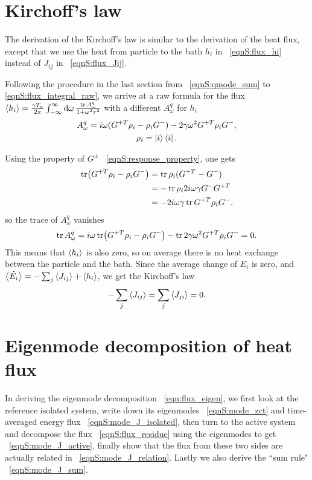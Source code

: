 \documentclass[
 amsmath,amssymb,
 aps,
 pre,
 longbibliography,
 10pt, onecolumn,
 notitlepage
]{revtex4-1}
\begin{document}
\section{Kirchoff's law}
The derivation of the Kirchoff's law is similar to the derivation of the heat flux, except that we use the heat from particle to the bath $h_i$ in \eqnname~\eqref{eqnS:flux_hi} instead of $J_{ij}$ in \eqnname~\eqref{eqnS:flux_Jij}.

Following the procedure in the last section from \eqnname~\eqref{eqnS:qmode_sum} to \eqref{eqnS:flux_integral_raw}, we arrive at a raw formula for the flux $\expval{h_i} = \frac{\gamma T_a}{2\pi} \int_{-\infty}^{\infty} \dd{\omega} \frac{\tr A_\omega^q}{1+\omega^2\tau^2}$ with a different $A_\omega^q$ for $h_i$
\begin{gather}
A_\omega^q = i\omega (G^{+T} \rho_i - \rho_iG^-) - 2\gamma\omega^2 G^{+T} \rho_i G^- ,\\
\rho_i = \ket{i}\bra{i} .
\end{gather}

Using the property of $G^\pm$ \eqnname~\eqref{eqnS:response_property}, one gets
\begin{equation}
\begin{split}
\tr (G^{+T} \rho_i - \rho_iG^-)
&= \tr \rho_i(G^{+T} - G^-) \\
&= -\tr \rho_i 2i\omega \gamma G^- G^{+T} \\
&= -2i\omega\gamma \tr G^{+T}\rho_i G^- ,
\end{split}
\end{equation}
so the trace of $A_\omega^q$ vanishes
\begin{equation}
\tr A_\omega^q
= i\omega \tr (G^{+T} \rho_i - \rho_iG^-) - \tr 2\gamma\omega^2 G^{+T} \rho_i G^- 
= 0 .
\end{equation}
This means that $\expval{h_i}$ is also zero, so on average there is no heat exchange between the particle and the bath. Since the average change of $E_i$ is zero, and $\expval{\dot{E_i}} = -\sum_j\expval{J_{ij}} + \expval{h_i}$, we get the Kirchoff's law
\begin{equation}
    -\sum_j\expval{J_{ij}} = \sum_j\expval{J_{ji}} = 0 .
\end{equation}


\section{Eigenmode decomposition of heat flux}
In deriving the eigenmode decomposition \eqnname~\eqref{eqn:flux_eigen}, we first look at the reference isolated system, write down its eigenmodes \eqnname~\eqref{eqnS:mode_zct} and time-averaged energy flux \eqnname~\eqref{eqnS:mode_J_isolated}, then turn to the active system and decompose the flux \eqnname~\eqref{eqnS:flux_residue} using the eigenmodes to get \eqnname~\eqref{eqnS:mode_J_active}, finally show that the flux from these two sides are actually related in \eqnname~\eqref{eqnS:mode_J_relation}.
Lastly we also derive the ``sum rule" \eqnname~\eqref{eqnS:mode_J_sum}.
\end{document}
